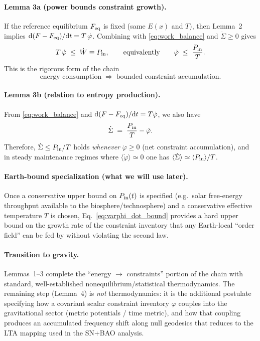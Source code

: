 \documentclass[10pt]{article}
\providecommand{\dd}{\mathrm{d}}
\begin{document}
\paragraph{Lemma 3a (power bounds constraint growth).}
If the reference equilibrium $F_{\rm eq}$ is fixed (same $E(x)$ and $T$), then Lemma~2 implies
$\dd(F-F_{\rm eq})/\dd t = T\,\dot\varphi$. Combining with \eqref{eq:work_balance} and $\dot\Sigma\ge0$ gives
\begin{equation}
T\,\dot\varphi \;\le\; \dot W \equiv P_{\rm in},
\qquad\text{equivalently}\qquad
\dot\varphi \;\le\; \frac{P_{\rm in}}{T}.
\label{eq:varphi_dot_bound}
\end{equation}
This is the rigorous form of the chain
\[
\text{energy consumption} \;\Rightarrow\; \text{bounded constraint accumulation}.
\]

\paragraph{Lemma 3b (relation to entropy production).}
From \eqref{eq:work_balance} and $\dd(F-F_{\rm eq})/\dd t = T\dot\varphi$, we also have
\begin{equation}
\dot\Sigma \;=\; \frac{P_{\rm in}}{T} - \dot\varphi.
\label{eq:sigma_phi_relation}
\end{equation}
Therefore, $\dot\Sigma\le P_{\rm in}/T$ holds \emph{whenever} $\dot\varphi\ge 0$ (net constraint
accumulation), and in steady maintenance regimes where $\langle\dot\varphi\rangle\simeq 0$ one has
$\langle\dot\Sigma\rangle\simeq \langle P_{\rm in}\rangle/T$.

\paragraph{Earth-bound specialization (what we will use later).}
Once a conservative upper bound on $P_{\rm in}(t)$ is specified (e.g.\ solar free-energy throughput
available to the biosphere/technosphere) and a conservative effective temperature $T$ is chosen,
Eq.~\eqref{eq:varphi_dot_bound} provides a hard upper bound on the growth rate of the constraint
inventory that any Earth-local ``order field'' can be fed by without violating the second law.

\paragraph{Transition to gravity.}
Lemmas~1--3 complete the ``energy $\to$ constraints'' portion of the chain with standard,
well-established nonequilibrium/statistical thermodynamics. The remaining step (Lemma~4) is
\emph{not} thermodynamics: it is the additional postulate specifying how a covariant scalar
constraint inventory $\varphi$ couples into the gravitational sector (metric potentials / time
metric), and how that coupling produces an accumulated frequency shift along null geodesics that
reduces to the LTA mapping used in the SN+BAO analysis.
\end{document}
